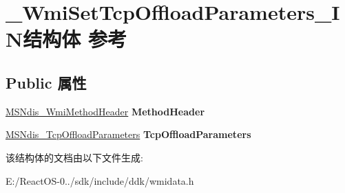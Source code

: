 \hypertarget{struct___wmi_set_tcp_offload_parameters___i_n}{}\section{\+\_\+\+Wmi\+Set\+Tcp\+Offload\+Parameters\+\_\+\+I\+N结构体 参考}
\label{struct___wmi_set_tcp_offload_parameters___i_n}
\subsection*{Public 属性}
\begin{DoxyCompactItemize}
\item 
\mbox{\label{struct___wmi_set_tcp_offload_parameters___i_n_acb911a9fbe2d39a0d60a899664710fdc}} 
\hyperlink{struct___m_s_ndis___wmi_method_header}{M\+S\+Ndis\+\_\+\+Wmi\+Method\+Header} {\bfseries Method\+Header}
\item 
\mbox{\label{struct___wmi_set_tcp_offload_parameters___i_n_aacf1dfbc548225da5fb61c4d88b6641e}} 
\hyperlink{struct___m_s_ndis___tcp_offload_parameters}{M\+S\+Ndis\+\_\+\+Tcp\+Offload\+Parameters} {\bfseries Tcp\+Offload\+Parameters}
\end{DoxyCompactItemize}


该结构体的文档由以下文件生成\+:\begin{DoxyCompactItemize}
\item 
E\+:/\+React\+O\+S-\/0../sdk/include/ddk/wmidata.\+h\end{DoxyCompactItemize}
